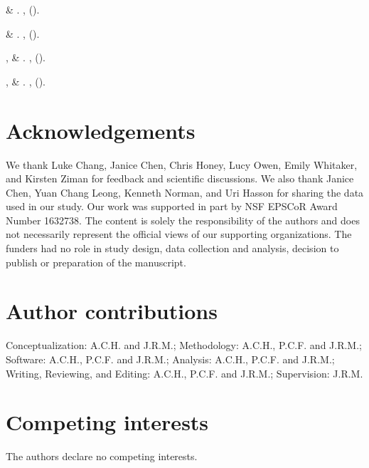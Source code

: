 \documentclass[10pt]{article}
\begin{document}
\begin{thebibliography}{10}
 \& 
\newblock {}.
\newblock \emph{}
  \textbf{}, 
  ().

 \& 
\newblock {}.
\newblock \emph{} \textbf{},
   ().

,  \&
\newblock {}.
\newblock \emph{} \textbf{},
   ().

,  \&
\newblock {}.
\newblock \emph{}
  \textbf{}, 
  ().

\end{thebibliography}


\section*{Acknowledgements}
We thank Luke Chang, Janice Chen, Chris Honey, Lucy Owen, Emily Whitaker, and Kirsten Ziman for feedback and scientific discussions. We also thank Janice Chen, Yuan Chang Leong, Kenneth Norman, and Uri Hasson for sharing the data used in our study.  Our work was supported in part by NSF EPSCoR Award Number 1632738. The content is solely the responsibility of the authors and does not necessarily represent the official views of our supporting organizations.  The funders had no role in study design, data collection and analysis, decision to publish or preparation of the manuscript.

\section*{Author contributions}
Conceptualization: A.C.H. and J.R.M.; Methodology: A.C.H., P.C.F. and J.R.M.; Software: A.C.H., P.C.F. and J.R.M.; Analysis: A.C.H., P.C.F. and J.R.M.; Writing, Reviewing, and Editing: A.C.H., P.C.F. and J.R.M.; Supervision: J.R.M.

\section*{Competing interests}
The authors declare no competing interests.
\end{document}
